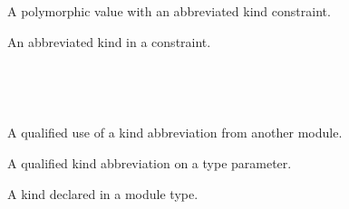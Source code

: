 \medbreak
\label{Oxcaml--val-poly_abbrev}\begin{ocamlindent}A polymorphic value with an abbreviated kind constraint.\end{ocamlindent}%
\medbreak
\label{Oxcaml--type-t_with_abbrev}\begin{ocamlindent}An abbreviated kind in a  constraint.\end{ocamlindent}%
\medbreak
\label{Oxcaml--module-M_kinds}\label{Oxcaml-M_kinds}\begin{ocamlindent}\label{Oxcaml-M_kinds--kind-mod_kind}\\
\end{ocamlindent}%
\\
\label{Oxcaml--type-t_qualified}\begin{ocamlindent}A qualified use of a kind abbreviation from another module.\end{ocamlindent}%
\medbreak
\label{Oxcaml--type-qualified_param}\begin{ocamlindent}A qualified kind abbreviation on a type parameter.\end{ocamlindent}%
\medbreak
\label{Oxcaml--module-type-S_kind}\label{Oxcaml-module-type-S_kind}\begin{ocamlindent}\label{Oxcaml-module-type-S_kind--kind-functor_kind}\begin{ocamlindent}A kind declared in a module type.\end{ocamlindent}%
\medbreak
\end{ocamlindent}%
